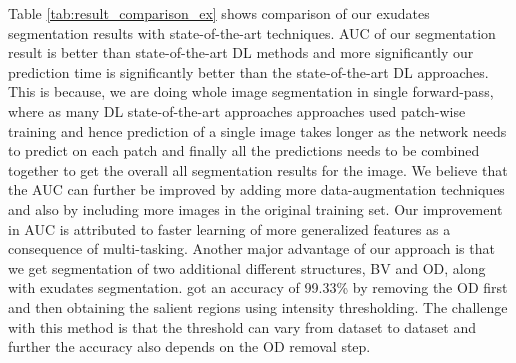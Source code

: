 \documentclass[utf8]{FrontiersinHarvard} %
\begin{document}
Table \ref{tab:result_comparison_ex} shows comparison of our exudates segmentation results with state-of-the-art techniques. AUC of our segmentation result is better than state-of-the-art DL methods \cite{kou2020enhanced} and more significantly our prediction time is significantly better than the state-of-the-art DL approaches. This is because, we are doing whole image segmentation in single forward-pass, where as many DL state-of-the-art approaches approaches used patch-wise training and hence prediction of a single image takes longer as the network needs to predict on each patch and finally all the predictions needs to be combined together to get the overall all segmentation results for the image.  We believe that the AUC can further be improved by adding more data-augmentation techniques and also by including more images in the original training set. Our improvement in AUC is attributed to faster learning of more generalized features as a consequence of multi-tasking. Another major advantage of our approach is that we get segmentation of two additional different structures, BV and OD, along with exudates segmentation. \cite{nur2018exudate} got an accuracy of 99.33\% by removing the OD first and then obtaining the salient regions using intensity thresholding. The challenge with this method is that the threshold can vary from dataset to dataset and further the accuracy also depends on the OD removal step.
\end{document}
